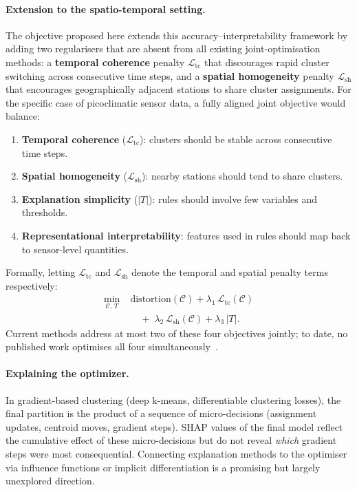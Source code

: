 \documentclass{article}
\theoremstyle{plain}
\theoremstyle{definition}
\theoremstyle{remark}
\begin{document}
\paragraph{Extension to the spatio-temporal setting.}
The objective proposed here extends this accuracy--interpretability
framework by adding two regularisers that are absent from all existing
joint-optimisation methods: a \textbf{temporal coherence} penalty
$\mathcal{L}_\mathrm{tc}$ that discourages rapid cluster switching across
consecutive time steps, and a \textbf{spatial homogeneity} penalty
$\mathcal{L}_\mathrm{sh}$ that encourages geographically adjacent stations
to share cluster assignments. For the specific case of picoclimatic sensor
data, a fully aligned joint objective would balance:
\begin{enumerate}
  \item \textbf{Temporal coherence} ($\mathcal{L}_\mathrm{tc}$): clusters
    should be stable across consecutive time steps.
  \item \textbf{Spatial homogeneity} ($\mathcal{L}_\mathrm{sh}$): nearby
    stations should tend to share clusters.
  \item \textbf{Explanation simplicity} ($|T|$): rules should involve few
    variables and thresholds.
  \item \textbf{Representational interpretability}: features used in rules
    should map back to sensor-level quantities.
\end{enumerate}
Formally, letting $\mathcal{L}_\mathrm{tc}$ and $\mathcal{L}_\mathrm{sh}$
denote the temporal and spatial penalty terms respectively:
\[
\begin{aligned}
  \min_{\mathcal{C},\,T}\;
    &\mathrm{distortion}(\mathcal{C})
     + \lambda_1\,\mathcal{L}_\mathrm{tc}(\mathcal{C}) \\
    &\quad+\;\lambda_2\,\mathcal{L}_\mathrm{sh}(\mathcal{C})
     + \lambda_3\,|T|.
\end{aligned}
\]
Current methods address at most two of these four objectives jointly;
to date, no published work optimises all four
simultaneously~\cite{portugal_framework_2024,hwang_xclusters_2023}.

\paragraph{Explaining the optimizer.}
In gradient-based clustering (deep k-means, differentiable clustering
losses), the final partition is the product of a sequence of micro-decisions
(assignment updates, centroid moves, gradient steps). SHAP values of the
final model reflect the cumulative effect of these micro-decisions but
do not reveal \emph{which} gradient steps were most consequential.
Connecting explanation methods to the optimiser via influence functions or
implicit differentiation is a promising but largely unexplored direction.
\end{document}
